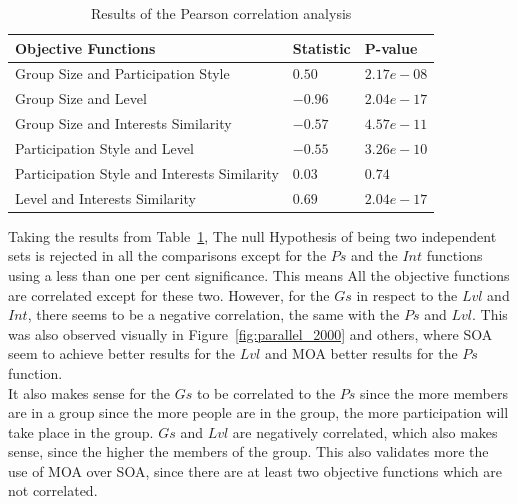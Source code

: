 \begin{table}[H]
\centering

\begin{tabular}{lll}
\hline
Objective Functions & Statistic & P-value \\
\hline
Group Size and Participation Style & $0.50$ & $2.17e-08$ \\
Group Size and Level & $-0.96$ & $2.04e-17$ \\
Group Size and Interests Similarity & $-0.57$ & $4.57e-11$ \\
Participation Style and Level & $-0.55$ & $3.26e-10$ \\
Participation Style and Interests Similarity & $0.03$ & $0.74$ \\
Level and Interests Similarity & $0.69$ & $2.04e-17$ \\
\hline
\end{tabular}%

\caption{Results of the Pearson correlation analysis}
\label{tab:correlation}
\end{table}

Taking the results from Table~\ref{tab:correlation}, The null Hypothesis of being two independent sets is rejected in all the comparisons except for the $Ps$ and the $Int$ functions using a less than one per cent significance. This means All the objective functions are correlated except for these two. However, for the $Gs$ in respect to the $Lvl$ and $Int$, there seems to be a negative correlation, the same with the $Ps$ and $Lvl$. This was also observed visually in Figure~\ref{fig:parallel_2000} and others, where SOA seem to achieve better results for the $Lvl$ and MOA better results for the $Ps$ function.\\

It also makes sense for the $Gs$  to be correlated to the $Ps$ since the more members are in a group since the more people are in the group, the more participation will take place in the group. $Gs$ and $Lvl$ are negatively correlated, which also makes sense, since the higher the members of the group.
This also validates more the use of MOA over SOA, since there are at least two objective functions which are not correlated.